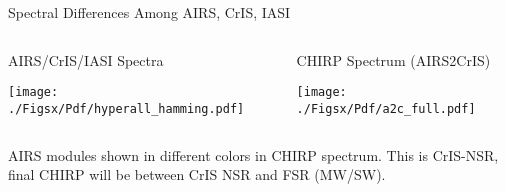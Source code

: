 \documentclass[10pt,t]{beamer}
\begin{document}
\begin{frame}[label={sec:orgda48009}]{Spectral Differences Among AIRS, CrIS, IASI}
\vspace{-0.2in}
\begin{columns}
\begin{column}{0.55\columnwidth}
\begin{block}{AIRS/CrIS/IASI Spectra}
\begin{center}
\texttt{[image: ./Figsx/Pdf/hyperall\_hamming.pdf]}
\end{center}
\end{block}
\end{column}


\begin{column}{0.55\columnwidth}
\begin{block}{CHIRP Spectrum (AIRS2CrIS)}
\begin{center}
\texttt{[image: ./Figsx/Pdf/a2c\_full.pdf]}
\end{center}
\end{block}
\end{column}
\end{columns}

AIRS modules shown in different colors in CHIRP spectrum. This is CrIS-NSR, final CHIRP will be between CrIS NSR and FSR (MW/SW).
\end{frame}
\end{document}
